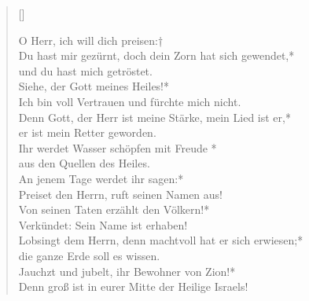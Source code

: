 \begin{verse}[\versewidth]
 
O Herr, ich will dich preisen:†\\
Du hast mir gezürnt, doch dein Zorn hat sich gewendet,*\\
und du hast mich getröstet.\\

\vin Siehe, der Gott meines Heiles!*\\
\vin Ich bin voll Vertrauen und fürchte mich nicht.\\


Denn Gott, der Herr ist meine Stärke,
mein Lied ist er,*\\
er ist mein Retter geworden.\\

\vin Ihr werdet Wasser schöpfen mit Freude *\\
\vin aus den Quellen des Heiles.\\

An jenem Tage werdet ihr sagen:*\\
Preiset den Herrn, ruft seinen Namen aus!\\

\vin Von seinen Taten erzählt den Völkern!*\\
\vin Verkündet: Sein Name ist erhaben!\\

Lobsingt dem Herrn, denn machtvoll hat er sich erwiesen;*\\
die ganze Erde soll es wissen.\\

\vin Jauchzt und jubelt, ihr Bewohner von Zion!*\\
\vin Denn groß ist in eurer Mitte der Heilige Israels!\\
\end{verse}

\vspace{0.6cm}


